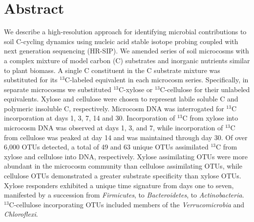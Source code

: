 \section{Abstract}
We describe a high-resolution approach for identifying microbial contributions
to soil C-cycling dynamics using nucleic acid stable isotope probing coupled
with next generation sequencing (HR-SIP). We amended series of soil microcosms
with a complex mixture of model carbon (C) substrates and inorganic nutrients
similar to plant biomass. A single C constituent in the C substrate mixture was
substituted for its $^{13}$C-labeled equivalent in each microcosm series.
Specifically, in separate microcosms we substituted $^{13}$C-xylose or
$^{13}$C-cellulose for their unlabeled equivalents. Xylose and cellulose were
chosen to represent labile soluble C and polymeric insoluble C, respectively.
Microcosm DNA was interrogated for $^{13}$C incorporation at days 1, 3, 7, 14 and 
30. Incorporation of $^{13}$C from xylose into microcosm DNA
was observed at days 1, 3, and 7, while incorporation of $^{13}$C from
cellulose was peaked at day 14 and was maintained through day 30. Of over 6,000
OTUs detected, a total of 49 and 63 unique OTUs assimilated $^{13}$C from
xylose and cellulose into DNA, respectively. Xylose assimilating OTUs were more
abundant in the microcosm community than cellulose assimilating OTUs, while
cellulose OTUs demonstrated a greater substrate specificity than xylose OTUs. Xylose responders exhibited a unique time signature from days one to seven, manifested by a succession from \textit{Firmicutes}, to \textit{Bacteroidetes}, to \textit{Actinobacteria}. $^{13}$C-cellulose
incorporating OTUs included members of the \textit{Verrucomicrobia} and
\textit{Chloroflexi}.  

